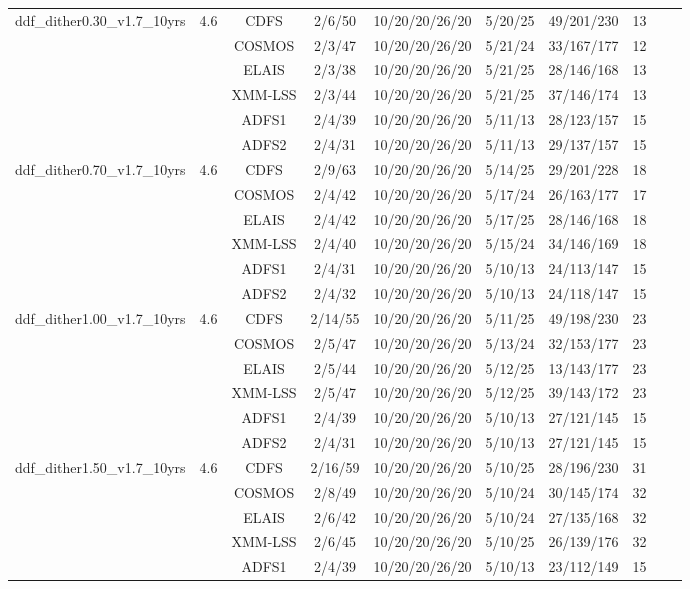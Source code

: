 \begin{center}
{\begin{tabular}{c|c|c|c|c|c|c|c|c|c}
ddf\_dither0.30\_v1.7\_10yrs& 4.6& CDFS & 2/6/50 & 10/20/20/26/20 & 5/20/25 & 49/201/230 & 13 \\ 
& & COSMOS & 2/3/47 & 10/20/20/26/20 & 5/21/24 & 33/167/177 & 12 \\ 
& & ELAIS & 2/3/38 & 10/20/20/26/20 & 5/21/25 & 28/146/168 & 13 \\ 
& & XMM-LSS & 2/3/44 & 10/20/20/26/20 & 5/21/25 & 37/146/174 & 13 \\ 
\hline 
& & ADFS1 & 2/4/39 & 10/20/20/26/20 & 5/11/13 & 28/123/157 & 15 \\ 
& & ADFS2 & 2/4/31 & 10/20/20/26/20 & 5/11/13 & 29/137/157 & 15 \\ 
ddf\_dither0.70\_v1.7\_10yrs& 4.6& CDFS & 2/9/63 & 10/20/20/26/20 & 5/14/25 & 29/201/228 & 18 \\ 
& & COSMOS & 2/4/42 & 10/20/20/26/20 & 5/17/24 & 26/163/177 & 17 \\ 
& & ELAIS & 2/4/42 & 10/20/20/26/20 & 5/17/25 & 28/146/168 & 18 \\ 
& & XMM-LSS & 2/4/40 & 10/20/20/26/20 & 5/15/24 & 34/146/169 & 18 \\ 
\hline 
& & ADFS1 & 2/4/31 & 10/20/20/26/20 & 5/10/13 & 24/113/147 & 15 \\ 
& & ADFS2 & 2/4/32 & 10/20/20/26/20 & 5/10/13 & 24/118/147 & 15 \\ 
ddf\_dither1.00\_v1.7\_10yrs& 4.6& CDFS & 2/14/55 & 10/20/20/26/20 & 5/11/25 & 49/198/230 & 23 \\ 
& & COSMOS & 2/5/47 & 10/20/20/26/20 & 5/13/24 & 32/153/177 & 23 \\ 
& & ELAIS & 2/5/44 & 10/20/20/26/20 & 5/12/25 & 13/143/177 & 23 \\ 
& & XMM-LSS & 2/5/47 & 10/20/20/26/20 & 5/12/25 & 39/143/172 & 23 \\ 
\hline 
& & ADFS1 & 2/4/39 & 10/20/20/26/20 & 5/10/13 & 27/121/145 & 15 \\ 
& & ADFS2 & 2/4/31 & 10/20/20/26/20 & 5/10/13 & 27/121/145 & 15 \\ 
ddf\_dither1.50\_v1.7\_10yrs& 4.6& CDFS & 2/16/59 & 10/20/20/26/20 & 5/10/25 & 28/196/230 & 31 \\ 
& & COSMOS & 2/8/49 & 10/20/20/26/20 & 5/10/24 & 30/145/174 & 32 \\ 
& & ELAIS & 2/6/42 & 10/20/20/26/20 & 5/10/24 & 27/135/168 & 32 \\ 
& & XMM-LSS & 2/6/45 & 10/20/20/26/20 & 5/10/25 & 26/139/176 & 32 \\ 
\hline 
& & ADFS1 & 2/4/39 & 10/20/20/26/20 & 5/10/13 & 23/112/149 & 15 \\ 

\end{tabular}}
\end{center}
